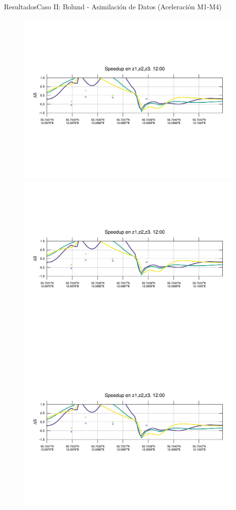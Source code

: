 \documentclass[mathserif,10pt]{beamer}
\begin{document}
\begin{frame}{Resultados}{Caso II: Bolund - Asimilación de Datos (Aceleración M1-M4)}
	\begin{figure}[H]
		\centering
		\includegraphics[width=0.65\linewidth,trim={12mm 84mm 10mm 74mm},page=1,clip]{fig/06/bol_da/speedup}\\%
		\includegraphics[width=0.65\linewidth,trim={12mm 84mm 10mm 74mm},page=13,clip]{fig/06/bol_da/speedup}\\%
		\includegraphics[width=0.65\linewidth,trim={12mm 84mm 10mm 74mm},page=25,clip]{fig/06/bol_da/speedup}\\%

\end{figure}
\end{frame}
\end{document}
